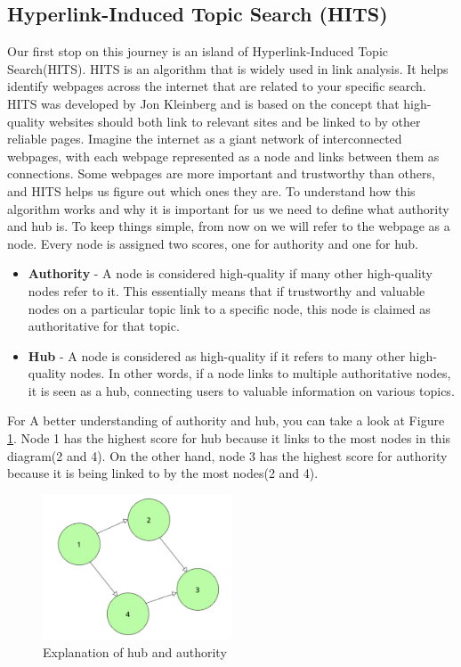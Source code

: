 \documentclass[10pt,english,a4paper]{article}
\begin{document}
\subsection{Hyperlink-Induced Topic Search (HITS)}\label{hits}
Our first stop on this journey is an island of Hyperlink-Induced Topic Search(HITS). HITS is an algorithm that is widely used in link analysis. It helps identify webpages across the internet that are related to your specific search. HITS was developed by Jon Kleinberg and is based on the concept that high-quality websites should both link to relevant sites and be linked to by other reliable pages. Imagine the internet as a giant network of interconnected webpages, with each webpage represented as a node and links between them as connections. Some webpages are more important and trustworthy than others, and HITS helps us figure out which ones they are. To understand how this algorithm works and why it is important for us we need to define what authority and hub is. To keep things simple, from now on we will refer to the webpage as a node. Every node is assigned two scores, one for authority and one for hub.
\begin{itemize}
	\item \textbf{Authority} - A node is considered high-quality if many other high-quality nodes refer to it. This essentially means that if trustworthy and valuable nodes on a particular topic link to a specific node, this node is claimed as authoritative for that topic.
	\item \textbf{Hub} - A node is considered as high-quality if it refers to many other high-quality nodes. In other words, if a node links to multiple authoritative nodes, it is seen as a hub, connecting users to valuable information on various topics.
\end{itemize}
For A better understanding of authority and hub, you can take a look at Figure \ref{explanationHITS}. Node 1 has the highest score for hub because it links to the most nodes in this diagram(2 and 4). On the other hand, node 3 has the highest score for authority because it is being linked to by the most nodes(2 and 4).
\begin{figure}[h]
  \centering
  \includegraphics[width=0.5\textwidth]{explanation_HITS.png}
  \caption{Explanation of hub and authority}
  \label{explanationHITS}
\end{figure}
\end{document}
